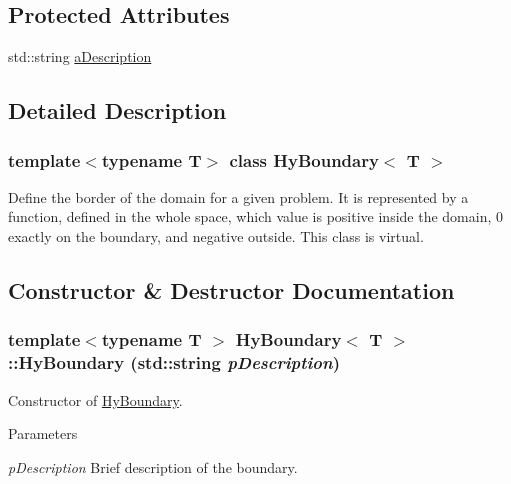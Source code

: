 \subsection*{Protected Attributes}
\begin{DoxyCompactItemize}
\item 
std::string \hyperlink{classHyBoundary_a0eeb51edf5863746b1f7dbc12c61b1c6}{aDescription}
\end{DoxyCompactItemize}


\subsection{Detailed Description}
\subsubsection*{template$<$typename T$>$ class HyBoundary$<$ T $>$}

Define the border of the domain for a given problem. It is represented by a function, defined in the whole space, which value is positive inside the domain, 0 exactly on the boundary, and negative outside. This class is virtual. 

\subsection{Constructor \& Destructor Documentation}
\hypertarget{classHyBoundary_a7d47a3c2a01860fa91c754e049e620d5}{
\subsubsection[{HyBoundary}]{\setlength{\rightskip}{0pt plus 5cm}template$<$typename T $>$ {\bf HyBoundary}$<$ T $>$::{\bf HyBoundary} (std::string {\em pDescription})}}
\label{classHyBoundary_a7d47a3c2a01860fa91c754e049e620d5}


Constructor of \hyperlink{classHyBoundary}{HyBoundary}. 


\begin{DoxyParams}{Parameters}
\item[{\em pDescription}]Brief description of the boundary. \end{DoxyParams}



